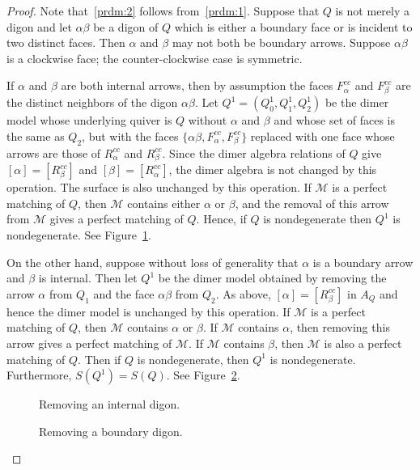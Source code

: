 \documentclass{article}
\theoremstyle{definition}
\begin{document}
\begin{proof}
	Note that~\eqref{prdm:2} follows from~\eqref{prdm:1}. Suppose that $Q$ is not merely a digon and let $\alpha\beta$ be a digon of $Q$ which is either a boundary face or is incident to two distinct faces. Then $\alpha$ and $\beta$ may not both be boundary arrows. Suppose $\alpha\beta$ is a clockwise face; the counter-clockwise case is symmetric. 

	If $\alpha$ and $\beta$ are both internal arrows, then by assumption the faces $F_\alpha^{cc}$ and $F_\beta^{cc}$ are the distinct neighbors of the digon $\alpha\beta$. 
	Let $Q^1=(Q^1_0,Q^1_1,Q^1_2)$ be the dimer model whose underlying quiver is $Q$ without $\alpha$ and $\beta$ and whose set of faces is the same as $Q_2$, but with the faces $\{\alpha\beta,F_\alpha^{cc},F_\beta^{cc}\}$ replaced with one face whose arrows are those of $R_\alpha^{cc}$ and $R_\beta^{cc}$. Since the dimer algebra relations of $Q$ give $[\alpha]=[R_\beta^{cc}]$ and $[\beta]=[R_\alpha^{cc}]$, the dimer algebra is not changed by this operation. The surface is also unchanged by this operation. 
	If $\mathcal M$ is a perfect matching of $Q$, then $\mathcal M$ contains either $\alpha$ or $\beta$, and the removal of this arrow from $\mathcal M$ gives a perfect matching of $Q$. Hence, if $Q$ is nondegenerate then $Q^1$ is nondegenerate.
		See Figure~\ref{fig:digon-remove1}.

		On the other hand, suppose without loss of generality that $\alpha$ is a boundary arrow and $\beta$ is internal. Then let $Q^1$ be the dimer model obtained by removing the arrow $\alpha$ from $Q_1$ and the face $\alpha\beta$ from $Q_2$. As above, $[\alpha]=[R_\beta^{cc}]$ in $A_Q$ and hence the dimer model is unchanged by this operation. If $\mathcal M$ is a perfect matching of $Q$, then $\mathcal M$ contains $\alpha$ or $\beta$. If $\mathcal M$ contains $\alpha$, then removing this arrow gives a perfect matching of $\mathcal M$. If $\mathcal M$ contains $\beta$, then $\mathcal M$ is also a perfect matching of $Q$. Then if $Q$ is nondegenerate, then $Q^1$ is nondegenerate. Furthermore, $S(Q^1)=S(Q)$. 
		See Figure~\ref{fig:digon-remove2}. 

		\def\svgwidth{200pt}
		\begin{figure}\centering
			
			\caption{Removing an internal digon.}
			\label{fig:digon-remove1}
		\end{figure}
		\def\svgwidth{200pt}
		\begin{figure}\centering
			
			\caption{Removing a boundary digon.}
			\label{fig:digon-remove2}
		\end{figure}



\end{proof}
\end{document}
